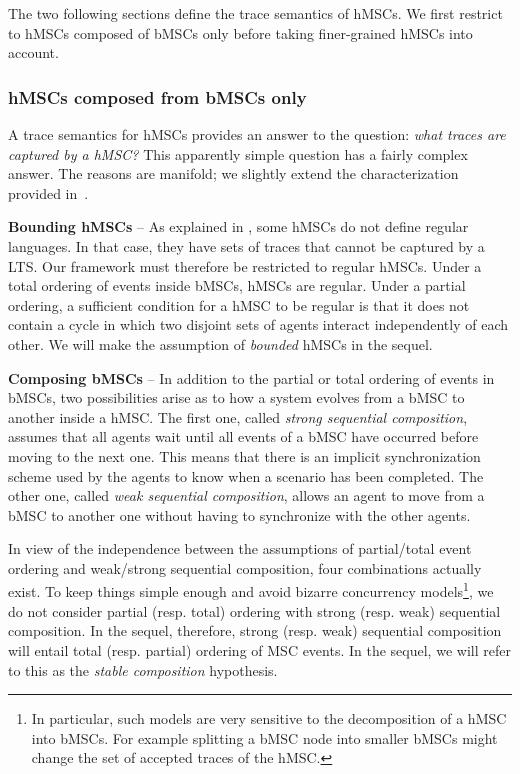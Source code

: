 The two following sections define the trace semantics of hMSCs. We first restrict to hMSCs composed of bMSCs only before taking finer-grained hMSCs into account. 

\subsubsection*{hMSCs composed from bMSCs only\label{subsubsection:hMSC-bMSC-only}}

A trace semantics for hMSCs provides an answer to the question: \emph{what traces are captured by a hMSC?} This apparently simple question has a fairly complex answer. The reasons are manifold; we slightly extend the characterization provided in~\cite{Uchitel:2004}.

\noindent \textbf{Bounding hMSCs} -- As explained in \cite{Henriksen:2000}, some hMSCs do not define regular languages. In that case, they have sets of traces that cannot be captured by a LTS. Our framework must therefore be restricted to regular hMSCs. Under a total ordering of events inside bMSCs, hMSCs are regular. Under a partial ordering, a sufficient condition for a hMSC to be regular is that it does not contain a cycle in which two disjoint sets of agents interact independently of each other. We will make the assumption of \emph{bounded} hMSCs in the sequel.

\noindent \textbf{Composing bMSCs} -- In addition to the partial or total ordering of events in bMSCs, two possibilities arise as to how a system evolves from a bMSC to another inside a hMSC. The first one, called \emph{strong sequential composition}, assumes that all agents wait until all events of a bMSC have occurred before moving to the next one. This means that there is an implicit synchronization scheme used by the agents to know when a scenario has been completed. The other one, called \emph{weak sequential composition}, allows an agent to move from a bMSC to another one without having to synchronize with the other agents. 

In view of the independence between the assumptions of partial/total event ordering and weak/strong sequential composition, four combinations actually exist. To keep things simple enough and avoid bizarre concurrency models\footnote{In particular, such models are very sensitive to the decomposition of a hMSC into bMSCs. For example splitting a bMSC node into smaller bMSCs might change the set of accepted traces of the hMSC.}, we do not consider partial (resp. total) ordering with strong (resp. weak) sequential composition. In the sequel, therefore, strong (resp. weak) sequential composition will entail total (resp. partial) ordering of MSC events. In the sequel, we will refer to this as the \emph{stable composition} hypothesis. 

